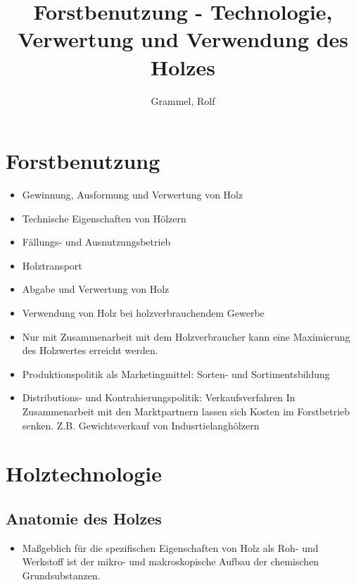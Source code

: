 \documentclass[12pt]{article}
\begin{document}
\begin{titlepage}
\author{Grammel, Rolf } 
\title{Forstbenutzung - Technologie, Verwertung und Verwendung des Holzes} 
\maketitle
\newpage
\tableofcontents
\end{titlepage} 

\newpage
\section*{Forstbenutzung}
\begin{itemize}
\item Gewinnung, Ausformung und Verwertung von Holz
\item Technische Eigenschaften von Hölzern
\item Fällungs- und Ausnutzungsbetrieb
\item Holztransport
\item Abgabe und Verwertung von Holz 
\item Verwendung von Holz bei holzverbrauchendem Gewerbe
\item Nur mit Zusammenarbeit mit dem Holzverbraucher kann eine Maximierung des Holzwertes erreicht werden.
\item Produktionspolitik als Marketingmittel: Sorten- und Sortimentsbildung
\item Distributions- und Kontrahierungspolitik: Verkaufsverfahren
In Zusammenarbeit mit den Marktpartnern lassen sich Kosten im Forstbetrieb senken.
Z.B. Gewichtsverkauf von Indusrtielanghölzern
\end{itemize}




\section{Holztechnologie}


\subsection{Anatomie des Holzes}
\begin{itemize}
  \item Maßgeblich für die spezifischen Eigenschaften von Holz als Roh- und
        Werkstoff ist der mikro- und makroskopische Aufbau der chemischen
        Grundsubstanzen.
\end{itemize}
\end{document}
